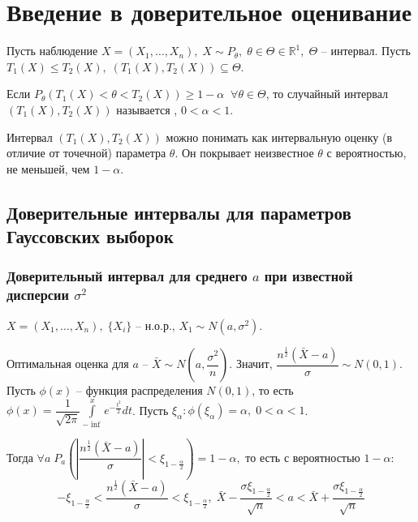 \chapter{Введение в доверительное оценивание} 

Пусть наблюдение $ X = (X_1, \ldots, X_n), \; X \sim P_{\theta}, \; \theta \in \Theta \in \mathbb{R}^1, \; \Theta $ -- интервал. Пусть $ T_1(X) \leq T_2(X), \; (T_1(X), T_2(X)) \subseteq \Theta $.

\begin{definition}
	Если $ P_{\theta}(T_1(X) < \theta < T_2(X)) \geq 1 - \alpha \;\; \forall \theta \in \Theta $, то случайный интервал $ (T_1(X), T_2(X)) $ называется , $ 0 < \alpha < 1 $.
\end{definition}

Интервал $ (T_1(X), T_2(X)) $ можно понимать как интервальную оценку (в отличие от точечной) параметра $ \theta $. Он покрывает неизвестное $ \theta $ с вероятностью, не меньшей, чем $ 1 - \alpha$.

\section{Доверительные интервалы для параметров Гауссовских выборок}

\subsection*{Доверительный интервал для среднего $ a $ при известной дисперсии $ \sigma^2 $}

$ X = (X_1, \ldots, X_n), \; \lbrace X_i \rbrace $ -- н.о.р., $ X_1 \sim N(a, \sigma^2) $.

Оптимальная оценка для $ a $ -- $ \bar{X} \sim N(a, \dfrac{\sigma^2}{n}) $. Значит, $ \dfrac{n^{\frac{1}{2}}(\bar{X} - a)}{\sigma} \sim N(0, 1) $. Пусть $ \phi(x) $ -- функция распределения $ N(0, 1) $, то есть $ \phi(x) = \dfrac{1}{\sqrt{2 \pi}} \int\limits_{- \inf}^x e^{-\frac{t^2}{2}}dt $. Пусть $ \xi_{\alpha}: \phi(\xi_{\alpha}) = \alpha, \; 0 < \alpha < 1 $.

Тогда $ \forall a \; P_a(|\dfrac{n^{\frac{1}{2}}(\bar{X} - a)}{\sigma}| < \xi_{1 - \frac{\alpha}{2}}) = 1 - \alpha, $ то есть с вероятностью $ 1 - \alpha$:
$$ -\xi_{1 - \frac{\alpha}{2}}< \dfrac{n^{\frac{1}{2}}(\bar{X} - a)}{\sigma} < \xi_{1 - \frac{\alpha}{2}}, \; \bar{X} - \dfrac{\sigma\xi_{1 - \frac{\alpha}{2}}}{\sqrt{n}} < a <  \bar{X} + \dfrac{\sigma\xi_{1 - \frac{\alpha}{2}}}{\sqrt{n}}$$

